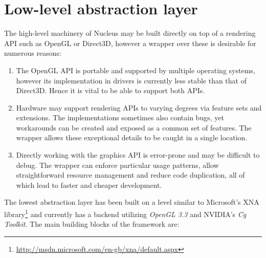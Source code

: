 \section{Low-level abstraction layer}
\label{sec:lowLevelInfo}

The high-level machinery of Nucleus may be built directly on top of a rendering API such as OpenGL or Direct3D, however a wrapper over these is desirable for numerous reasons:

\begin{enumerate}
\item The OpenGL API is portable and supported by multiple operating systems, however its implementation in drivers is currently less stable than that of Direct3D. Hence it is vital to be able to support both APIs.
\item Hardware may support rendering APIs to varying degrees via feature sets and extensions. The implementations sometimes also contain bugs, yet workarounds can be created and exposed as a common set of features. The wrapper allows these exceptional details to be caught in a single location.
\item Directly working with the graphics API is error-prone and may be difficult to debug. The wrapper can enforce particular usage patterns, allow straightforward resource management and reduce code duplication, all of which lead to faster and cheaper development.
\end{enumerate}

The lowest abstraction layer has been built on a level similar to Microsoft's XNA library\footnote{\url{http://msdn.microsoft.com/en-gb/xna/default.aspx}} and currently has a backend utilizing \emph{OpenGL 3.3} and NVIDIA's \emph{Cg Toolkit}. The main building blocks of the framework are:

